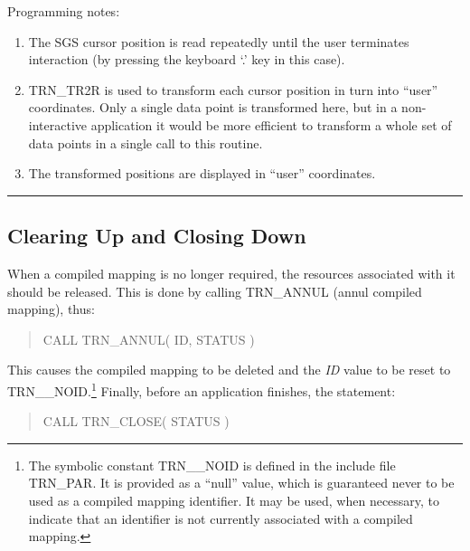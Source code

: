 \documentclass[twoside,nolof,11pt]{starlink}
\providecommand{\name}[1]{\small{#1}}
\providecommand{\fortvar}[1]{\emph{#1}}
\providecommand{\exampledone}[0]{\begin{center} \rule{6em}{0.2mm} \end{center}}
\begin{document}
Programming notes:

\begin{enumerate}

\item The \name{SGS} cursor position is read repeatedly until the user
terminates interaction (by pressing the keyboard `.' key in this case).

\item \name{TRN\_TR2R} is used to transform each cursor position in turn
into ``user'' coordinates.
Only a single data point is transformed here, but in a non-interactive
application it would be more efficient to transform a whole set of data
points in a single call to this routine.

\item The transformed positions are displayed in ``user'' coordinates.

\end{enumerate}
\exampledone


\subsection{Clearing Up and Closing Down}

\label{section:simple:cleanup}

When a compiled mapping is no longer required, the resources associated with
it should be released.
This is done by calling \name{TRN\_ANNUL} (annul compiled mapping), thus:

\begin{quote}
\begin{terminalv}
CALL TRN_ANNUL( ID, STATUS )
\end{terminalv}
\end{quote}

This causes the compiled mapping to be deleted and the \fortvar{ID} value
to be reset to \name{TRN\_\_NOID}.\footnote{
The symbolic constant \name{TRN\_\_NOID} is defined in the include file
\name{TRN\_PAR}.
It is provided as a ``null'' value, which is guaranteed never to be used as
a compiled mapping identifier.
It may be used, when necessary, to indicate that an identifier is not
currently associated with a compiled mapping.}
Finally, before an application finishes, the statement:

\begin{quote}
\begin{terminalv}
CALL TRN_CLOSE( STATUS )
\end{terminalv}
\end{quote}
\end{document}
